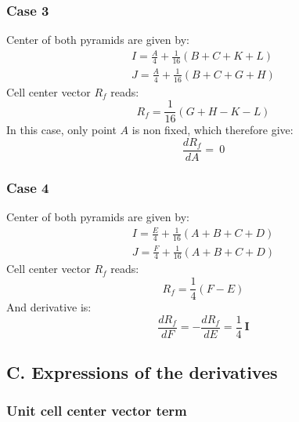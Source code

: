 \documentclass[11pt]{article}
\begin{document}
\subsubsection*{Case 3}

Center of both pyramids are given by:
\begin{subequations}
\begin{gather}
I = \frac{A}{4} + \frac{1}{16} (B + C + K + L) \\
J = \frac{A}{4} + \frac{1}{16} (B + C + G + H)
\end{gather}
\end{subequations} 
Cell center vector $R_f$ reads:
\begin{equation}
R_f = \frac{1}{16} ( G + H - K - L)
\end{equation}
In this case, only point $A$ is non fixed, which therefore give:
\begin{equation}
\frac{d R_f}{d A} = \ 0 
\end{equation}


\subsubsection*{Case 4}

Center of both pyramids are given by:
\begin{subequations}
\begin{gather}
I = \frac{E}{4} + \frac{1}{16} (A + B + C + D) \\
J = \frac{F}{4} + \frac{1}{16} (A + B + C + D)
\end{gather}
\end{subequations} 
Cell center vector $R_f$ reads:
\begin{equation}
R_f = \frac{1}{4} (F-E)
\end{equation}
And derivative is:
\begin{equation}
\frac{d R_f}{d F} = - \frac{d R_f}{d E} = \frac{1}{4}\ \boldsymbol{I}
\end{equation}



\subsection*{C. Expressions of the derivatives}

\subsubsection*{Unit cell center vector term}
\end{document}
